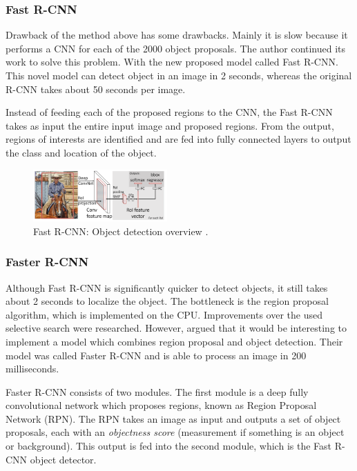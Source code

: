 \subsubsection{Fast R-CNN}
Drawback of the method above has some drawbacks. Mainly it is slow because it performs a CNN for each of the 2000 object proposals. The author continued its work to solve this problem. With the new proposed model called Fast R-CNN. This novel model can detect object in an image in 2 seconds, whereas the original R-CNN takes about 50 seconds per image.

Instead of feeding each of the proposed regions to the CNN, the Fast R-CNN takes as input the entire input image and proposed regions. From the output, regions of interests are identified and are fed into fully connected layers to output the class and location of the object. 

\begin{figure}[ht]
\begin{center}
\includegraphics[height=2cm,keepaspectratio]{images/2_literature/fast-r-cnn.png}
\end{center}
\caption{Fast R-CNN: Object detection overview \cite{Girshick2013}.}
\end{figure}

\subsubsection{Faster R-CNN}
Although Fast R-CNN is significantly quicker to detect objects, it still takes about 2 seconds to localize the object. The bottleneck is the region proposal algorithm, which is implemented on the CPU. Improvements over the used selective search were researched. However,  argued that it would be interesting to implement a model which combines region proposal and object detection. Their model was called Faster R-CNN and is able to process an image in 200 milliseconds. 

Faster R-CNN consists of two modules. The first module is a deep fully convolutional network which proposes regions, known as Region Proposal Network (RPN). The RPN takes an image as input and outputs a set of object proposals, each with an \textit{objectness score} (measurement if something is an object or background). This output is fed into the second module, which is the Fast R-CNN object detector. 

